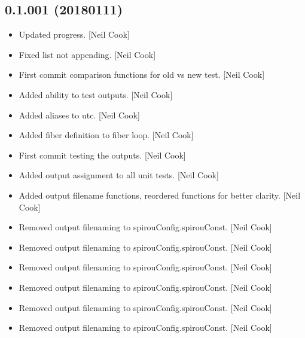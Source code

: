 \documentclass[a4paper,10pt,english]{report}
\begin{document}
\subsection{0.1.001 (2018\sphinxhyphen{}01\sphinxhyphen{}11)}
\label{\detokenize{misc/changelog:id522}}\begin{itemize}
\item {} 
Updated progress. {[}Neil Cook{]}

\item {} 
Fixed list not appending. {[}Neil Cook{]}

\item {} 
First commit \sphinxhyphen{} comparison functions for old vs new test. {[}Neil Cook{]}

\item {} 
Added ability to test outputs. {[}Neil Cook{]}

\item {} 
Added aliases to utc. {[}Neil Cook{]}

\item {} 
Added fiber definition to fiber loop. {[}Neil Cook{]}

\item {} 
First commit  \sphinxhyphen{} testing the outputs. {[}Neil Cook{]}

\item {} 
Added output assignment to all unit tests. {[}Neil Cook{]}

\item {} 
Added output filename functions, reordered functions for better
clarity. {[}Neil Cook{]}

\item {} 
Removed output filenaming to spirouConfig.spirouConst. {[}Neil Cook{]}

\item {} 
Removed output filenaming to spirouConfig.spirouConst. {[}Neil Cook{]}

\item {} 
Removed output filenaming to spirouConfig.spirouConst. {[}Neil Cook{]}

\item {} 
Removed output filenaming to spirouConfig.spirouConst. {[}Neil Cook{]}

\item {} 
Removed output filenaming to spirouConfig.spirouConst. {[}Neil Cook{]}

\item {} 
Removed output filenaming to spirouConfig.spirouConst. {[}Neil Cook{]}


\end{itemize}
\end{document}
